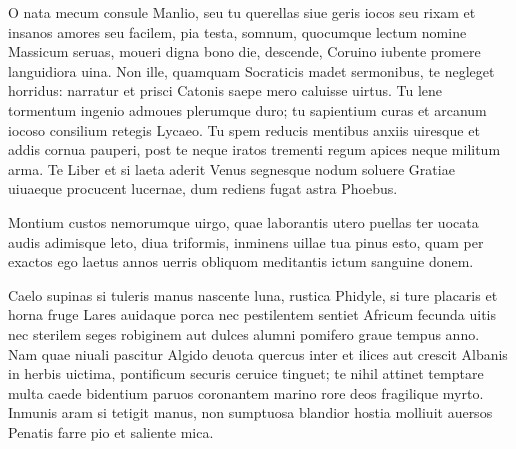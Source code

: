 \documentclass{book}
\newenvironment {carmen} [1] [\relax] 
  {\Titulus \Versus \incipit*\numerus{1}#1}
  {\endVersus}
\newcommand {\Sapphic}   {\Forma \strophae {0 \poena 00 \poena 1}}
\newcommand {\Alcaic}    {\Forma \strophae {0 \poena 01 \poena 2}}
\begin{document}
\begin{carmen}[\Alcaic]


O nata mecum consule Manlio,
 seu tu querellas siue geris iocos
      seu rixam et insanos amores
      seu facilem, pia testa, somnum, 
quocumque lectum nomine Massicum               
 seruas, moueri digna bono die,
      descende, Coruino iubente
      promere languidiora uina. 
Non ille, quamquam Socraticis madet
 sermonibus, te negleget horridus:               
      narratur et prisci Catonis
      saepe mero caluisse uirtus. 
Tu lene tormentum ingenio admoues
 plerumque duro; tu sapientium
      curas et arcanum iocoso               
      consilium retegis Lycaeo. 
Tu spem reducis mentibus anxiis
 uiresque et addis cornua pauperi,
      post te neque iratos trementi
      regum apices neque militum arma.                
Te Liber et si laeta aderit Venus
 segnesque nodum soluere Gratiae
      uiuaeque procucent lucernae,
      dum rediens fugat astra Phoebus. 

\end{carmen}

\begin{carmen}[\Sapphic]


Montium custos nemorumque uirgo,
 quae laborantis utero puellas
 ter uocata audis adimisque leto,
      diua triformis, 
inminens uillae tua pinus esto,               
 quam per exactos ego laetus annos
 uerris obliquom meditantis ictum
      sanguine donem. 

\end{carmen}

\begin{carmen}[\Alcaic]


Caelo supinas si tuleris manus
 nascente luna, rustica Phidyle,
      si ture placaris et horna
      fruge Lares auidaque porca 
nec pestilentem sentiet Africum               
 fecunda uitis nec sterilem seges
      robiginem aut dulces alumni
      pomifero graue tempus anno. 
Nam quae niuali pascitur Algido
 deuota quercus inter et ilices               
      aut crescit Albanis in herbis
      uictima, pontificum securis 
ceruice tinguet; te nihil attinet
 temptare multa caede bidentium
      paruos coronantem marino               
      rore deos fragilique myrto. 
Inmunis aram si tetigit manus,
 non sumptuosa blandior hostia
      molliuit auersos Penatis
      farre pio et saliente mica.                

\end{carmen}
\end{document}
